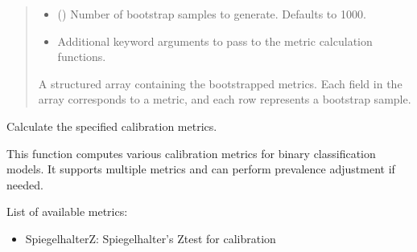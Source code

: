 \documentclass[letterpaper,10pt,english]{sphinxmanual}
\begin{document}
\begin{fulllineitems}
\begin{fulllineitems}
\begin{quote}
\begin{description}
\begin{itemize}
\item {} 
\sphinxAtStartPar
{} (\sphinxstyleliteralemphasis{\sphinxupquote{, }}) \textendash{} Number of bootstrap samples to generate. Defaults to 1000.

\item {} 
\sphinxAtStartPar
{} \textendash{} Additional keyword arguments to pass to the metric calculation functions.

\end{itemize}

\sphinxAtStartPar
{} \textendash{} A structured array containing the bootstrapped metrics. Each field in the array
corresponds to a metric, and each row represents a bootstrap sample.

\end{description}\end{quote}

\end{fulllineitems}


\begin{fulllineitems}
\label{\detokenize{calzone:calzone.metrics.CalibrationMetrics.calculate_metrics}}
\pysigstartsignatures
{}
\pysigstopsignatures
\sphinxAtStartPar
Calculate the specified calibration metrics.

\sphinxAtStartPar
This function computes various calibration metrics for binary classification models.
It supports multiple metrics and can perform prevalence adjustment if needed.

\sphinxAtStartPar
List of available metrics:
\begin{itemize}
\item {} 
\sphinxAtStartPar
SpiegelhalterZ: Spiegelhalter’s Z\sphinxhyphen{}test for calibration


\end{itemize}
\end{fulllineitems}
\end{fulllineitems}
\end{document}
